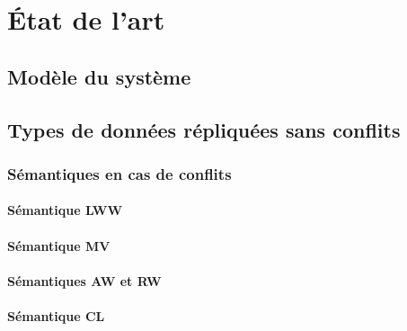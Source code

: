 \NumberThisInToc
\chapter{État de l'art}
\minitoc
\label{chap:state-of-art}



\section{Modèle du système}


% 

% 

\section{Types de données répliquées sans conflits}


\subsection{Sémantiques en cas de conflits}


\subsubsection{Sémantique \acl{LWW}}


\subsubsection{Sémantique \acl{MV}}


\subsubsection{Sémantiques \acl{AW} et \acl{RW}}


\subsubsection{Sémantique \acl{CL}}


